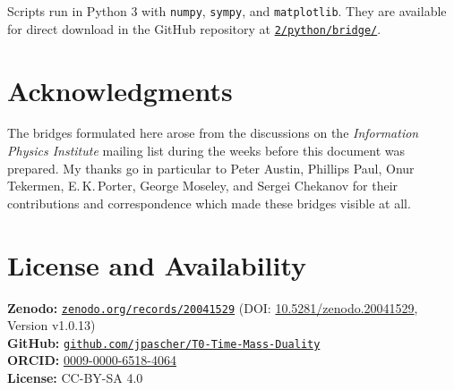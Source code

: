 Scripts run in Python 3 with \texttt{numpy}, \texttt{sympy}, and \texttt{matplotlib}. They are available for direct download in the GitHub repository at \href{https://github.com/jpascher/T0-Time-Mass-Duality/tree/main/2/python/bridge}{\texttt{2/python/bridge/}}.

\section*{Acknowledgments}

The bridges formulated here arose from the discussions on the \emph{Information Physics Institute} mailing list during the weeks before this document was prepared. My thanks go in particular to Peter Austin, Phillips Paul, Onur Tekermen, E.\,K.\,Porter, George Moseley, and Sergei Chekanov for their contributions and correspondence which made these bridges visible at all.

\section*{License and Availability}

\textbf{Zenodo:} \href{https://zenodo.org/records/20041529}{\texttt{zenodo.org/records/20041529}} (DOI: \href{https://doi.org/10.5281/zenodo.20041529}{10.5281/zenodo.20041529}, Version v1.0.13)\\
\textbf{GitHub:} \href{https://github.com/jpascher/T0-Time-Mass-Duality}{\texttt{github.com/jpascher/T0-Time-Mass-Duality}}\\
\textbf{ORCID:} \href{https://orcid.org/0009-0000-6518-4064}{0009-0000-6518-4064}\\
\textbf{License:} CC-BY-SA 4.0

